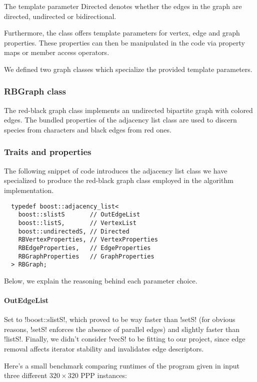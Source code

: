 The template parameter Directed denotes whether the edges in the graph are directed, undirected or bidirectional.

Furthermore, the class offers template parameters for vertex, edge and graph properties.
These properties can then be manipulated in the code via property maps or member access operators.

We defined two graph classes which specialize the provided template parameters.

\subsubsection{RBGraph class}\label{section:rbgraph-class}

The red-black graph class implements an undirected bipartite graph with colored edges.
The bundled properties of the adjacency list class are used to discern species from characters and black edges from red ones.

\subsubsection*{Traits and properties}

The following snippet of code introduces the adjacency list class we have specialized to produce the red-black graph class employed in the algorithm implementation.

\begin{lstlisting}
  typedef boost::adjacency_list<
    boost::slistS       // OutEdgeList
    boost::listS,       // VertexList
    boost::undirectedS, // Directed
    RBVertexProperties, // VertexProperties
    RBEdgeProperties,   // EdgeProperties
    RBGraphProperties   // GraphProperties
  > RBGraph;
\end{lstlisting}

Below, we explain the reasoning behind each parameter choice.

\paragraph{OutEdgeList}

Set to !boost::slistS!, which proved to be way faster than !setS! (for obvious reasons, !setS! enforces the absence of parallel edges) and slightly faster than !listS!.
Finally, we didn't consider !vecS! to be fitting to our project, since edge removal affects iterator stability and invalidates edge descriptors.

Here's a small benchmark comparing runtimes of the program given in input three different $320 \times 320$ PPP instances:

